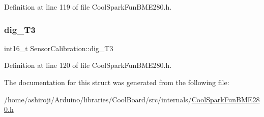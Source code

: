 Definition at line 119 of file Cool\+Spark\+Fun\+B\+M\+E280.\+h.

\mbox{\label{struct_sensor_calibration_a5b134db1776888487855c6b526d130d6}} 
\subsubsection{\texorpdfstring{dig\+\_\+\+T3}{dig\_T3}}
{\footnotesize\ttfamily int16\+\_\+t Sensor\+Calibration\+::dig\+\_\+\+T3}



Definition at line 120 of file Cool\+Spark\+Fun\+B\+M\+E280.\+h.



The documentation for this struct was generated from the following file\+:\begin{DoxyCompactItemize}
\item 
/home/ashiroji/\+Arduino/libraries/\+Cool\+Board/src/internals/\hyperlink{_cool_spark_fun_b_m_e280_8h}{Cool\+Spark\+Fun\+B\+M\+E280.\+h}\end{DoxyCompactItemize}
